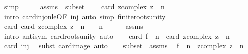 \begin{isabellebody}
\ simp\isanewline
\ \ \isamarkupfalse%
\ \isamarkupfalse%
\ assms\ \ subset\ \isamarkupfalse%
\ {\isachardoublequoteopen}{\isasymdots}\ {\isasymle}\ card\ {\isacharbraceleft}{\kern0pt}z{\isacharcolon}{\kern0pt}{\isacharcolon}{\kern0pt}complex{\isachardot}{\kern0pt}\ z\ {\isacharcircum}{\kern0pt}\ n\ {\isacharequal}{\kern0pt}\ {}{\isacharbraceright}{\kern0pt}{\isachardoublequoteclose}\isanewline
\ \ \ \ \isamarkupfalse%
\ {\isacharparenleft}{\kern0pt}intro\ card{\isacharunderscore}{\kern0pt}inj{\isacharunderscore}{\kern0pt}on{\isacharunderscore}{\kern0pt}le{\isacharbrackleft}{\kern0pt}OF\ inj{\isacharbrackright}{\kern0pt}{\isacharparenright}{\kern0pt}\ {\isacharparenleft}{\kern0pt}auto\ simp{\isacharcolon}{\kern0pt}\ finite{\isacharunderscore}{\kern0pt}roots{\isacharunderscore}{\kern0pt}unity{\isacharparenright}{\kern0pt}\isanewline
\ \ \isamarkupfalse%
\ \isamarkupfalse%
\ card{\isacharcolon}{\kern0pt}\ {\isachardoublequoteopen}card\ {\isacharbraceleft}{\kern0pt}z{\isacharcolon}{\kern0pt}{\isacharcolon}{\kern0pt}complex{\isachardot}{\kern0pt}\ z\ {\isacharcircum}{\kern0pt}\ n\ {\isacharequal}{\kern0pt}\ {}{\isacharbraceright}{\kern0pt}\ {\isacharequal}{\kern0pt}\ n{\isachardoublequoteclose}\isanewline
\ \ \ \ \isamarkupfalse%
\ assms\ \isamarkupfalse%
\ {\isacharparenleft}{\kern0pt}intro\ antisym\ card{\isacharunderscore}{\kern0pt}roots{\isacharunderscore}{\kern0pt}unity{\isacharparenright}{\kern0pt}\ auto\isanewline
\isanewline
\ \ \isamarkupfalse%
\ {\isachardoublequoteopen}card\ {\isacharparenleft}{\kern0pt}{\isacharquery}{\kern0pt}f\ {\isacharbackquote}{\kern0pt}\ {\isacharbraceleft}{\kern0pt}{\isachardot}{\kern0pt}{\isachardot}{\kern0pt}{\isacharless}{\kern0pt}n{\isacharbraceright}{\kern0pt}{\isacharparenright}{\kern0pt}\ {\isacharequal}{\kern0pt}\ card\ {\isacharbraceleft}{\kern0pt}z{\isacharcolon}{\kern0pt}{\isacharcolon}{\kern0pt}complex{\isachardot}{\kern0pt}\ z\ {\isacharcircum}{\kern0pt}\ n\ {\isacharequal}{\kern0pt}\ {}{\isacharbraceright}{\kern0pt}{\isachardoublequoteclose}\isanewline
\ \ \ \ \isamarkupfalse%
\ card\ inj\ \isamarkupfalse%
\ {\isacharparenleft}{\kern0pt}subst\ card{\isacharunderscore}{\kern0pt}image{\isacharparenright}{\kern0pt}\ auto\isanewline
\ \ \isamarkupfalse%
\ subset\ \ assms\ \isamarkupfalse%
\ {\isachardoublequoteopen}{\isacharquery}{\kern0pt}f\ {\isacharbackquote}{\kern0pt}\ {\isacharbraceleft}{\kern0pt}{\isachardot}{\kern0pt}{\isachardot}{\kern0pt}{\isacharless}{\kern0pt}n{\isacharbraceright}{\kern0pt}\ {\isacharequal}{\kern0pt}\ {\isacharbraceleft}{\kern0pt}z{\isacharcolon}{\kern0pt}{\isacharcolon}{\kern0pt}complex{\isachardot}{\kern0pt}\ z\ {\isacharcircum}{\kern0pt}\ n\ {\isacharequal}{\kern0pt}\ {}{\isacharbraceright}{\kern0pt}{\isachardoublequoteclose}\isanewline

\end{isabellebody}
